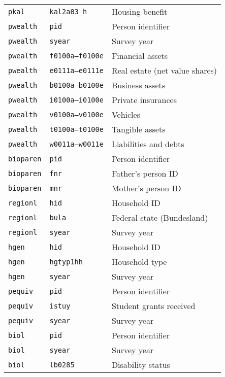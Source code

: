 \begin{longtable}{lll}
\texttt{pkal} & \texttt{kal2a03\_h} & Housing benefit \\
\texttt{pwealth} & \texttt{pid} & Person identifier \\
\texttt{pwealth} & \texttt{syear} & Survey year \\
\texttt{pwealth} & \texttt{f0100a--f0100e} & Financial assets \\
\texttt{pwealth} & \texttt{e0111a--e0111e} & Real estate (net value shares) \\
\texttt{pwealth} & \texttt{b0100a--b0100e} & Business assets \\
\texttt{pwealth} & \texttt{i0100a--i0100e} & Private insurances \\
\texttt{pwealth} & \texttt{v0100a--v0100e} & Vehicles \\
\texttt{pwealth} & \texttt{t0100a--t0100e} & Tangible assets \\
\texttt{pwealth} & \texttt{w0011a--w0011e} & Liabilities and debts \\
\texttt{bioparen} & \texttt{pid} & Person identifier \\
\texttt{bioparen} & \texttt{fnr} & Father’s person ID \\
\texttt{bioparen} & \texttt{mnr} & Mother’s person ID \\
\texttt{regionl} & \texttt{hid} & Household ID \\
\texttt{regionl} & \texttt{bula} & Federal state (Bundesland) \\
\texttt{regionl} & \texttt{syear} & Survey year \\
\texttt{hgen} & \texttt{hid} & Household ID \\
\texttt{hgen} & \texttt{hgtyp1hh} & Household type \\
\texttt{hgen} & \texttt{syear} & Survey year \\
\texttt{pequiv} & \texttt{pid} & Person identifier \\
\texttt{pequiv} & \texttt{istuy} & Student grants received \\
\texttt{pequiv} & \texttt{syear} & Survey year \\
\texttt{biol} & \texttt{pid} & Person identifier \\
\texttt{biol} & \texttt{syear} & Survey year \\
\texttt{biol} & \texttt{lb0285} & Disability status \\
\end{longtable}
